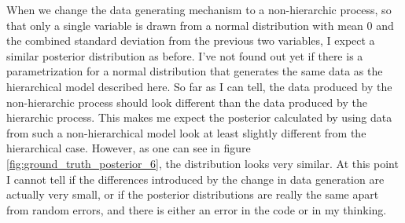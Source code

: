 \documentclass{article}
\begin{document}

When we change the data generating mechanism to a non-hierarchic process, so that only a single variable is drawn from a normal distribution with mean 0 and the combined standard deviation from the previous two variables, I expect a similar posterior distribution as before. I've not found out yet if there is a parametrization for a normal distribution that generates the same data as the hierarchical model described here. So far as I can tell, the data produced by the non-hierarchic process should look different than the data produced by the hierarchic process. This makes me expect the posterior calculated by using data from such a non-hierarchical model look at least slightly different from the hierarchical case. However, as one can see in figure \ref{fig:ground_truth_posterior_6}, the distribution looks very similar. At this point I cannot tell if the differences introduced by the change in data generation are actually very small, or if the posterior distributions are really the same apart from random errors, and there is either an error in the code or in my thinking.
\end{document}
